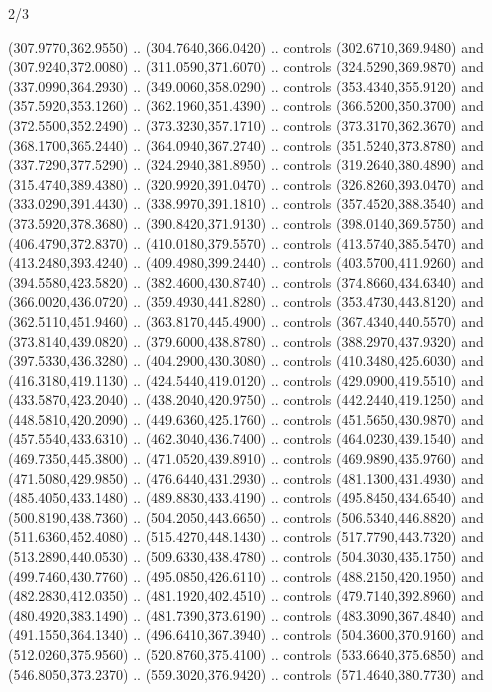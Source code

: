 \begin{flagdescription}{2/3}
\begin{scope}[xshift=0.5\flaglength]
\begin{scope}[scale=0.0021\flagwidth,yshift=167.8mm,xshift=-125.3mm]
\begin{scope}[y=-0.8pt, x=0.8pt, inner sep=0pt, outer sep=0pt]
  (307.9770,362.9550) .. (304.7640,366.0420) .. controls (302.6710,369.9480) and
  (307.9240,372.0080) .. (311.0590,371.6070) .. controls (324.5290,369.9870) and
  (337.0990,364.2930) .. (349.0060,358.0290) .. controls (353.4340,355.9120) and
  (357.5920,353.1260) .. (362.1960,351.4390) .. controls (366.5200,350.3700) and
  (372.5500,352.2490) .. (373.3230,357.1710) .. controls (373.3170,362.3670) and
  (368.1700,365.2440) .. (364.0940,367.2740) .. controls (351.5240,373.8780) and
  (337.7290,377.5290) .. (324.2940,381.8950) .. controls (319.2640,380.4890) and
  (315.4740,389.4380) .. (320.9920,391.0470) .. controls (326.8260,393.0470) and
  (333.0290,391.4430) .. (338.9970,391.1810) .. controls (357.4520,388.3540) and
  (373.5920,378.3680) .. (390.8420,371.9130) .. controls (398.0140,369.5750) and
  (406.4790,372.8370) .. (410.0180,379.5570) .. controls (413.5740,385.5470) and
  (413.2480,393.4240) .. (409.4980,399.2440) .. controls (403.5700,411.9260) and
  (394.5580,423.5820) .. (382.4600,430.8740) .. controls (374.8660,434.6340) and
  (366.0020,436.0720) .. (359.4930,441.8280) .. controls (353.4730,443.8120) and
  (362.5110,451.9460) .. (363.8170,445.4900) .. controls (367.4340,440.5570) and
  (373.8140,439.0820) .. (379.6000,438.8780) .. controls (388.2970,437.9320) and
  (397.5330,436.3280) .. (404.2900,430.3080) .. controls (410.3480,425.6030) and
  (416.3180,419.1130) .. (424.5440,419.0120) .. controls (429.0900,419.5510) and
  (433.5870,423.2040) .. (438.2040,420.9750) .. controls (442.2440,419.1250) and
  (448.5810,420.2090) .. (449.6360,425.1760) .. controls (451.5650,430.9870) and
  (457.5540,433.6310) .. (462.3040,436.7400) .. controls (464.0230,439.1540) and
  (469.7350,445.3800) .. (471.0520,439.8910) .. controls (469.9890,435.9760) and
  (471.5080,429.9850) .. (476.6440,431.2930) .. controls (481.1300,431.4930) and
  (485.4050,433.1480) .. (489.8830,433.4190) .. controls (495.8450,434.6540) and
  (500.8190,438.7360) .. (504.2050,443.6650) .. controls (506.5340,446.8820) and
  (511.6360,452.4080) .. (515.4270,448.1430) .. controls (517.7790,443.7320) and
  (513.2890,440.0530) .. (509.6330,438.4780) .. controls (504.3030,435.1750) and
  (499.7460,430.7760) .. (495.0850,426.6110) .. controls (488.2150,420.1950) and
  (482.2830,412.0350) .. (481.1920,402.4510) .. controls (479.7140,392.8960) and
  (480.4920,383.1490) .. (481.7390,373.6190) .. controls (483.3090,367.4840) and
  (491.1550,364.1340) .. (496.6410,367.3940) .. controls (504.3600,370.9160) and
  (512.0260,375.9560) .. (520.8760,375.4100) .. controls (533.6640,375.6850) and
  (546.8050,373.2370) .. (559.3020,376.9420) .. controls (571.4640,380.7730) and

\end{scope}
\end{scope}
\end{scope}
\end{flagdescription}
